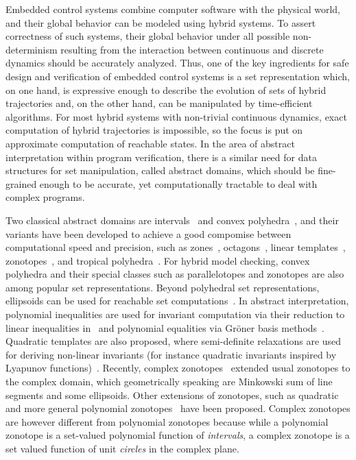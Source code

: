 Embedded control systems combine computer software with the physical
world, and their global behavior can be modeled using hybrid systems.
To assert correctness of such systems, their global behavior under all
possible non-determinism resulting from the interaction between
continuous and discrete dynamics should be accurately analyzed. Thus,
one of the key ingredients for safe design and verification of
embedded control systems is a set representation which, on one hand,
is expressive enough to describe the evolution of sets of hybrid
trajectories and, on the other hand, can be manipulated by
time-efficient algorithms. For most hybrid systems with non-trivial
continuous dynamics, exact computation of hybrid trajectories is
impossible, so the focus is put on approximate computation of
reachable states. In the area of abstract interpretation within
program verification, there is a similar need for data structures for
set manipulation, called abstract domains, which should be
fine-grained enough to be accurate, yet computationally tractable to
deal with complex programs.
 
Two classical abstract domains are intervals~\cite{CousotCousot76-1}
and convex polyhedra~\cite{DBLP:conf/popl/CousotH78}, and their
variants have been developed to achieve a good compomise between
computational speed and precision, such as
zones~\cite{DBLP:conf/pado/Mine01},
octagons~\cite{DBLP:journals/lisp/Mine06}, linear
templates~\cite{VMCAI05}, zonotopes~\cite{HSCC05}, and tropical
polyhedra~\cite{DBLP:conf/sas/AllamigeonGG08}. For hybrid model
checking, convex polyhedra and their special classes such as
parallelotopes and zonotopes are also among popular set
representations.  Beyond polyhedral set representations, ellipsoids
can be used for reachable set computations~\cite{KurzhanskiVaraiya00}.
In abstract interpretation, polynomial inequalities are used for
invariant computation via their reduction to linear inequalities
in~\cite{bagrodzafSAS05} and polynomial equalities via Gr\"{o}ner
basis methods~\cite{Rodriguez-Carbonell:2007}. Quadratic templates are
also proposed, where semi-definite relaxations are used for deriving
non-linear invariants (for instance quadratic invariants inspired by
Lyapunov functions)~\cite{Feron2010,AdjeGaubertGoubaultESOP2010}.
Recently, complex zonotopes~\cite{arvind2016lis} extended usual
zonotopes to the complex domain, which geometrically speaking are
Minkowski sum of line segments and some ellipsoids.  Other extensions
of zonotopes, such as quadratic~\cite{DBLP:conf/aplas/AdjeGW15} and
more general polynomial zonotopes~\cite{althoff2013} have been
proposed. Complex zonotopes are however different from polynomial
zonotopes because while a polynomial zonotope is a set-valued
polynomial function of
\emph{intervals}, a complex zonotope is a set valued function of unit
\emph{circles} in the complex plane.


